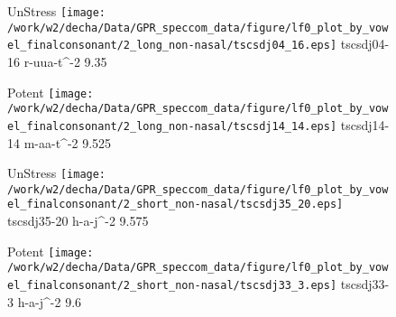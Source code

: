 \documentclass{article}
\begin{document}
\begin{figure}[t]
\begin{minipage}[b]{.24\textwidth}
UnStress
\centering
\texttt{[image: /work/w2/decha/Data/GPR\_speccom\_data/figure/lf0\_plot\_by\_vowel\_finalconsonant/2\_long\_non-nasal/tscsdj04\_16.eps]}
tscsdj04-16 r-uua-t\textasciicircum-2 9.35
\end{minipage}
\begin{minipage}[b]{.24\textwidth}
\colorbox{Apricot}{Potent}
\centering
\texttt{[image: /work/w2/decha/Data/GPR\_speccom\_data/figure/lf0\_plot\_by\_vowel\_finalconsonant/2\_long\_non-nasal/tscsdj14\_14.eps]}
tscsdj14-14 m-aa-t\textasciicircum-2 9.525
\end{minipage}
\begin{minipage}[b]{.24\textwidth}
UnStress
\centering
\texttt{[image: /work/w2/decha/Data/GPR\_speccom\_data/figure/lf0\_plot\_by\_vowel\_finalconsonant/2\_short\_non-nasal/tscsdj35\_20.eps]}
tscsdj35-20 h-a-j\textasciicircum-2 9.575
\end{minipage}
\begin{minipage}[b]{.24\textwidth}
\colorbox{Apricot}{Potent}
\centering
\texttt{[image: /work/w2/decha/Data/GPR\_speccom\_data/figure/lf0\_plot\_by\_vowel\_finalconsonant/2\_short\_non-nasal/tscsdj33\_3.eps]}
tscsdj33-3 h-a-j\textasciicircum-2 9.6
\end{minipage}
\end{figure}
\end{document}
